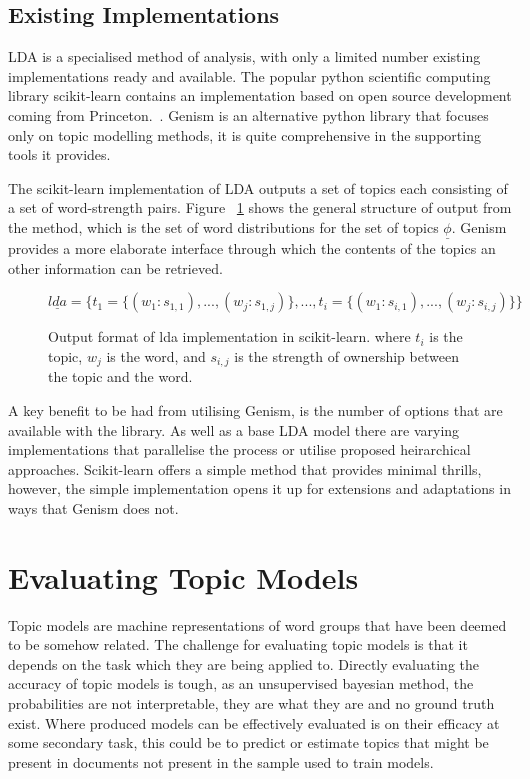 \documentclass[10pt]{report}
\begin{document}
\subsection{Existing Implementations}

LDA is a specialised method of analysis, with only a limited number existing implementations ready and available. The popular python scientific computing library scikit-learn contains an implementation based on open source development coming from Princeton.~\cite{scikit-learn, Hoffman_undated-nx}. Genism is an alternative python library that focuses only on topic modelling methods, it is quite comprehensive in the supporting tools it provides.~\cite{rehurek_lrec}

The scikit-learn implementation of LDA outputs a set of topics each consisting of a set of word-strength pairs. Figure ~\ref{fig:lda_sklearn_output} shows the general structure of output from the method, which is the set of word distributions for the set of topics $\underline\phi$. Genism provides a more elaborate interface through which the contents of the topics an other information can be retrieved. 
\begin{figure}[h!]
\[
  \underline{lda} = \{t_1 = \{(w_1 : s_{1,1}), ..., (w_j : s_{1,j})\}, ..., t_i =\{(w_1 : s_{i,1}), ..., (w_j : s_{i,j})\}\}
\]
\caption{Output format of lda implementation in scikit-learn. where \(t_i\) is the topic, \(w_j\) is the word, and \(s_{i,j}\) is the strength of ownership between the topic and the word. \label{fig:lda_sklearn_output}}
\end{figure}

A key benefit to be had from utilising Genism, is the number of options that are available with the library. As well as a base LDA model there are varying implementations that parallelise the process or utilise proposed heirarchical approaches. Scikit-learn offers a simple method that provides minimal thrills, however, the simple implementation opens it up for extensions and adaptations in ways that Genism does not.

\section{Evaluating Topic Models}
Topic models are machine representations of word groups that have been deemed to be somehow related. The challenge for evaluating topic models is that it depends on the task which they are being applied to. Directly evaluating the accuracy of topic models is tough, as an unsupervised bayesian method, the probabilities are not interpretable, they are what they are and no ground truth exist. Where produced models can be effectively evaluated is on their efficacy at some secondary task, this could be to predict or estimate topics that might be present in documents not present in the sample used to train models.
\end{document}
